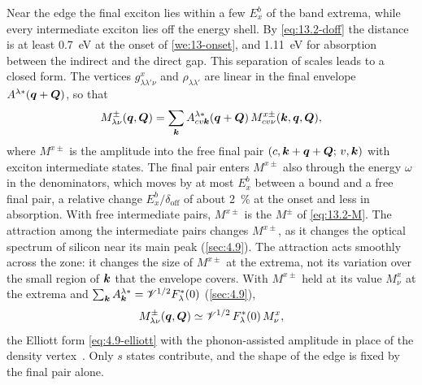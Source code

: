 Near the edge the final exciton lies within a few $E_x^b$ of the band extrema, while every intermediate exciton lies off the energy shell. By \cref{eq:13.2-doff} the distance is at least \SI{0.7}{eV} at the onset of \cref{we:13-onset}, and \SI{1.11}{eV} for absorption between the indirect and the direct gap. This separation of scales leads to a closed form. The vertices $g^x_{\lambda\lambda'\nu}$ and $\rho_{\lambda\lambda'}$ are linear in the final envelope $A^{\lambda*}(\bm{q}+\bm{Q})$, so that
\begin{equation*}
  M^\pm_{\lambda\nu}(\bm{q},\bm{Q}) = \sum_{\bm{k}}A^{\lambda*}_{cv\bm{k}}(\bm{q}+\bm{Q})\,M^{x\pm}_{cv\nu}(\bm{k},\bm{q},\bm{Q}) ,
\end{equation*}
where $M^{x\pm}$ is the amplitude into the free final pair $(c,\bm{k}+\bm{q}+\bm{Q};\,v,\bm{k})$ with exciton intermediate states. The final pair enters $M^{x\pm}$ also through the energy $\omega$ in the denominators, which moves by at most $E_x^b$ between a bound and a free final pair, a relative change $E_x^b/\delta_{\mathrm{off}}$ of about \SI{2}{\percent} at the onset and less in absorption. With free intermediate pairs, $M^{x\pm}$ is the $M^\pm$ of \cref{eq:13.2-M}. The attraction among the intermediate pairs changes $M^{x\pm}$, as it changes the optical spectrum of silicon near its main peak (\cref{sec:4.9}). The attraction acts smoothly across the zone: it changes the size of $M^{x\pm}$ at the extrema, not its variation over the small region of $\bm{k}$ that the envelope covers. With $M^{x\pm}$ held at its value $M^x_\nu$ at the extrema and $\sum_{\bm{k}}A^{\lambda*}_{\bm{k}} = \mathscr{V}^{1/2}F^*_\lambda(0)$ (\cref{sec:4.9}),
\begin{equation}
  M^\pm_{\lambda\nu}(\bm{q},\bm{Q}) \simeq \mathscr{V}^{1/2}\,F^*_\lambda(0)\,M^x_\nu ,
  \label{eq:13.8-elliott}
\end{equation}
the Elliott form \cref{eq:4.9-elliott} with the phonon-assisted amplitude in place of the density vertex~\cite{elliott1957intensity}. Only $s$ states contribute, and the shape of the edge is fixed by the final pair alone.

